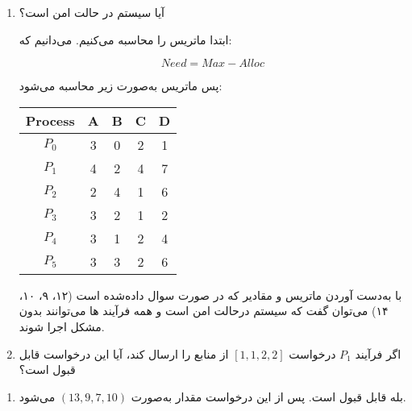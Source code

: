 \begin{enumerate}
	\item 
	آیا سیستم در حالت امن است؟
	
	\begin{qsolve}
		ابتدا ماتریس  را محاسبه می‌کنیم. می‌دانیم که:
		
		$$ Need = Max - Alloc $$
		
		پس ماتریس  به‌صورت زیر محاسبه می‌شود:
		
		\begin{center}
			\begin{tabular}{||c|c|c|c|c||}
				\hline 
				Process & A & B & C & D\\
				\hline \hline
				$P_0$ & 3 & 0 & 2 & 1 \\
				$P_1$ & 4 & 2 & 4 & 7 \\
				$P_2$ & 2 & 4 & 1 & 6 \\
				$P_3$ & 3 & 2 & 1 & 2 \\
				$P_4$ & 3 & 1 & 2 & 4 \\
				$P_5$ & 3 & 3 & 2 & 6 \\
				\hline
			\end{tabular}
		\end{center}
		
		
		با به‌دست آوردن ماتریس  و مقادیر  که در صورت سوال داده‌شده است (۱۲، ۹، ۱۰، ۱۴) می‌توان گفت که سیستم در‌حالت امن است و همه فرآیند ها می‌توانند بدون مشکل اجرا شوند.
		
	\end{qsolve}
	
	
	
	\item  
	اگر فرآیند $P_1 $ درخواست $ [1, 1, 2, 2] $ از منابع را ارسال کند، آیا این درخواست قابل قبول است؟
	
\end{enumerate}
\newpage


\begin{enumerate}
	\item [ ]
	\begin{qsolve}
		بله قابل قبول است. پس از این درخواست مقدار  به‌صورت $(13,9,7,10)$ می‌شود.
	\end{qsolve}
\end{enumerate}